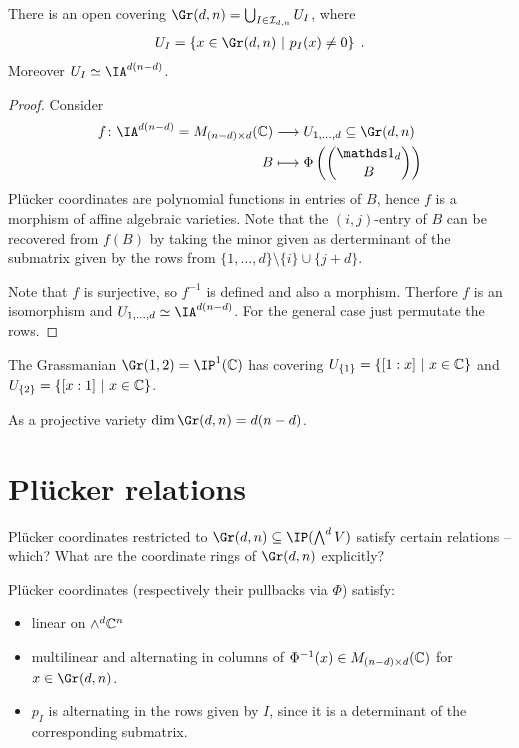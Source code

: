 \documentclass{skript}
\begin{document}
\begin{lemma}\label{lem:affinecovgrass}
    There is an open covering $\Gr(d,n) = \bigcup_{I\in \Ii_{d,n}} U_I$, where \begin{align*}U_I = \left\{x\in \Gr(d,n) \such p_I(x) \neq 0\right\}\;.\end{align*}
    Moreover $U_I \simeq \IA^{d(n-d)}$.
\end{lemma}
\begin{proof}
    Consider 
    \begin{align*}
        f\colon \IA^{d(n-d)} = M_{(n-d)\times d} (\IC) &\longrightarrow U_{1,\dots, d} \subseteq \Gr(d,n)\\
        B &\longmapsto \Phi\left(\binom {\IONE_d}B\right)
    \end{align*}
    Plücker coordinates are polynomial functions in entries of $B$, hence $f$ is a morphism of affine algebraic varieties.
    Note that the $(i,j)$-entry of $B$ can be recovered from $f(B)$ by taking the minor given as derterminant of the submatrix given by the rows from $\{1,\dots, d\}\setminus\{i\} \cup \{j+d\}$.

    Note that $f$ is surjective, so $f^{-1}$ is defined and also a morphism. 
    Therfore $f$ is an isomorphism and $U_{1,\dots, d} \simeq \IA^{d(n-d)}$. 
    For the general case just permutate the rows.
\end{proof}

\begin{bsp}
    The Grassmanian $\Gr(1,2) = \IP^1(\IC)$ has covering $U_{\{1\}} = \left\{[1:x]\ \middle|\  x\in \mathbb{C}\right\}$ and $U_{\{2\}} = \left\{[x:1]\ \middle|\  x\in \mathbb{C}\right\}$.
\end{bsp}
\begin{cor}
    As a projective variety $\dim \Gr(d,n) = d(n-d)$.
\end{cor}

\section{Plücker relations}
Plücker coordinates restricted to $\Gr(d,n)\subseteq \IP(\bigwedge^dV)$ satisfy certain relations -- which?
What are the coordinate rings of $\Gr(d,n)$ explicitly?

\begin{fact}
    Plücker coordinates (respectively their pullbacks via $\Phi$) satisfy:
    \begin{itemize}
        \item
            linear on $\wedge^d\mathbb{C}^n$
        \item
            multilinear and alternating in columns of $\Phi^{-1}(x) \in M_{(n-d)\times d}(\mathbb{C})$ for $x\in \Gr(d,n)$.
        \item
            $p_I$ is alternating in the rows given by $I$, since it is a determinant of the corresponding submatrix.
    \end{itemize}
\end{fact}
\end{document}
